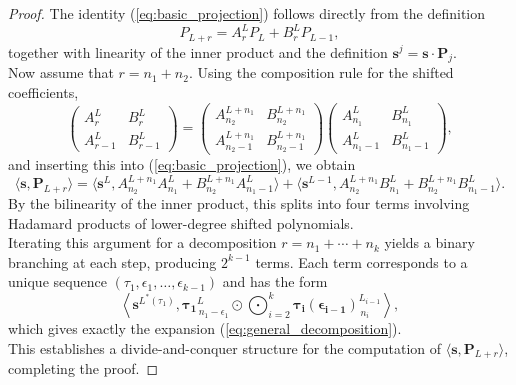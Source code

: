 \documentclass[11pt]{article}
\renewcommand\eqref[1]{(\ref{#1})} %
\theoremstyle{definition}
\theoremstyle{remark}
\numberwithin{equation}{section}
\begin{document}
\begin{proof}
The identity \eqref{eq:basic_projection} follows directly from the definition
\[
P_{L+r} = A_r^L P_L + B_r^L P_{L-1},
\]
together with linearity of the inner product and the definition
$\mathbf{s}^j = \mathbf{s}\cdot\mathbf{P}_j$.\\

Now assume that $r = n_1 + n_2$.  
Using the composition rule for the shifted coefficients,
\[
\begin{pmatrix}
A_{r}^L & B_{r}^L \\
A_{r-1}^L & B_{r-1}^L
\end{pmatrix}
=
\begin{pmatrix}
A_{n_2}^{L+n_1} & B_{n_2}^{L+n_1} \\
A_{n_2-1}^{L+n_1} & B_{n_2-1}^{L+n_1}
\end{pmatrix}
\begin{pmatrix}
A_{n_1}^L & B_{n_1}^L \\
A_{n_1-1}^L & B_{n_1-1}^L
\end{pmatrix},
\]
and inserting this into \eqref{eq:basic_projection}, we obtain
\[
\langle \mathbf{s}, \mathbf{P}_{L+r} \rangle
=
\langle \mathbf{s}^L, A_{n_2}^{L+n_1}A_{n_1}^L + B_{n_2}^{L+n_1}A_{n_1-1}^L \rangle
+
\langle \mathbf{s}^{L-1}, A_{n_2}^{L+n_1}B_{n_1}^L + B_{n_2}^{L+n_1}B_{n_1-1}^L \rangle.
\]
By the bilinearity of the inner product, this splits into four terms involving
Hadamard products of lower-degree shifted polynomials.\\

Iterating this argument for a decomposition
$r = n_1 + \cdots + n_k$ yields a binary branching at each step, producing
$2^{k-1}$ terms.  
Each term corresponds to a unique sequence
$(\tau_1,\epsilon_1,\ldots,\epsilon_{k-1})$ and has the form
\[
\left\langle
\mathbf{s}^{L^*(\tau_1)},
\mathbf{\tau_1}_{\,n_1-\epsilon_1}^{L}
\odot
\bigodot_{i=2}^{k}
\mathbf{\tau_i(\epsilon_{i-1})}_{\,n_i}^{L_{i-1}}
\right\rangle,
\]
which gives exactly the expansion \eqref{eq:general_decomposition}.\\

This establishes a divide-and-conquer structure for the computation of
$\langle \mathbf{s}, \mathbf{P}_{L+r} \rangle$, completing the proof.
\end{proof}
\end{document}
